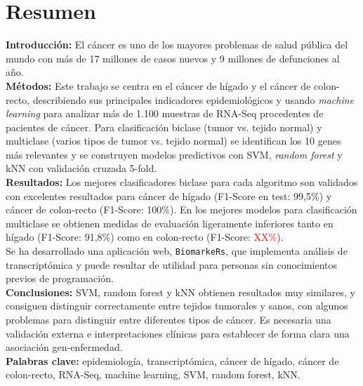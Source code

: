 \thispagestyle{plain}


\vspace{-30pt}

\section*{Resumen}

\textbf{Introducción:} El cáncer es uno de los mayores problemas de salud pública del mundo con más de 17 millones de casos nuevos y 9 millones de defunciones al año. \\

\textbf{Métodos:} Este trabajo se centra en el cáncer de hígado y el cáncer de colon-recto, describiendo sus principales indicadores epidemiológicos y usando \textit{machine learning} para analizar más de 1.100 muestras de RNA-Seq procedentes de pacientes de cáncer. Para clasificación biclase (tumor vs. tejido normal) y multiclase (varios tipos de tumor vs. tejido normal) se identifican los 10 genes más relevantes y se construyen modelos predictivos con SVM, \textit{random forest} y kNN con validación cruzada 5-fold.\\

\textbf{Resultados:} Los mejores clasificadores biclase para cada algoritmo son validados con excelentes resultados para cáncer de hígado (F1-Score en test: 99,5\%) y cáncer de colon-recto (F1-Score: 100\%). En los mejores modelos para clasificación multiclase se obtienen medidas de evaluación ligeramente inferiores tanto en hígado (F1-Score: 91,8\%) como en colon-recto (F1-Score: \textcolor{red}{XX\%}).\\

Se ha desarrollado una aplicación web, \texttt{BiomarkeRs}, que implementa análisis de transcriptómica y puede resultar de utilidad para personas sin conocimientos previos de programación.\\

\textbf{Conclusiones:} SVM, random forest y kNN obtienen resultados muy similares, y consiguen distinguir correctamente entre tejidos tumorales y sanos, con algunos problemas para distinguir entre diferentes tipos de cáncer. Es necesaria una validación externa e interpretaciones clínicas para establecer de forma clara una asociación gen-enfermedad.\\

\textbf{Palabras clave:} epidemiología, transcriptómica, cáncer de hígado, cáncer de colon-recto, RNA-Seq, machine learning, SVM, random forest, kNN.

